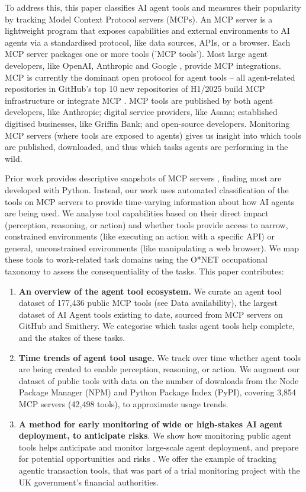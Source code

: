 \documentclass[manuscript,screen,nonacm,oneside]{acmart}
\begin{document}
To address this, this paper classifies AI agent tools and measures their popularity by tracking Model Context Protocol servers (MCPs). An MCP server is a lightweight program that exposes capabilities and external environments to AI agents via a standardised protocol, like data sources, APIs, or a browser. Each MCP server packages one or more tools ('MCP tools'). Most large agent developers, like OpenAI, Anthropic and Google \citep{casper2025agent}, provide MCP integrations. MCP is currently the dominant open protocol for agent tools -- all agent-related repositories in GitHub's top 10 new repositories of H1/2025 build MCP infrastructure or integrate MCP \citep{clickhouseClickHouseQuery,hackeroneWhatModel}. MCP tools are published by both agent developers, like Anthropic; digital service providers, like Asana; established digitised businesses, like Griffin Bank; and open-source developers. Monitoring MCP servers (where tools are exposed to agents) gives us insight into which tools are published, downloaded, and thus which tasks agents are performing in the wild.

Prior work provides descriptive snapshots of MCP servers \citep{lin2025large,ray2025survey,hou2025modelcontextprotocolmcp}, finding most are developed with Python. Instead, our work uses automated classification of the tools on MCP servers to provide time-varying information about how AI agents are being used. We analyse tool capabilities based on their direct impact (perception, reasoning, or action) and whether tools provide access to narrow, constrained environments (like executing an action with a specific API) or general, unconstrained environments (like manipulating a web browser). We map these tools to work-related task domains using the O*NET occupational taxonomy to assess the consequentiality of the tasks. This paper contributes:

\begin{enumerate}
\def\labelenumi{\arabic{enumi}.}
\item
 \textbf{An overview of the agent tool ecosystem.} We curate an agent tool dataset of 177,436 public MCP tools (see Data availability), the largest dataset of AI Agent tools existing to date, sourced from MCP servers on GitHub and Smithery. We categorise which tasks agent tools help complete, and the stakes of these tasks.
\item
 \textbf{Time trends of agent tool usage.} We track over time whether agent tools are being created to enable perception, reasoning, or action. We augment our dataset of public tools with data on the number of downloads from the Node Package Manager (NPM) and Python Package Index (PyPI), covering 3,854 MCP servers (42,498 tools), to approximate usage trends. 
\item
 \textbf{A method for early monitoring of wide or high-stakes AI agent deployment, to anticipate risks}. We show how monitoring public agent tools helps anticipate and monitor large-scale agent deployment, and prepare for potential opportunities and risks \citep{stein2024role,bernardi2024societal}. We offer the example of tracking agentic transaction tools, that was part of a trial monitoring project with the UK government's financial authorities.
\end{enumerate}
\end{document}
